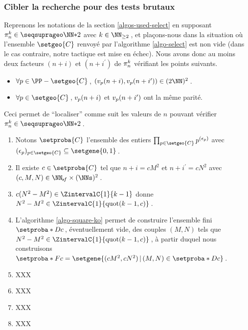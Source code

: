\subsubsection{Cibler la recherche pour des tests brutaux} \label{algos-used-kill}

\leavevmode
\smallskip

Reprenons les notations de la section \ref{algos-used-select} en supposant $\consprod \in \NNssquare$ avec $k \in \NN_{\geq 2}$\,, et plaçons-nous dans la situation où l'ensemble $\setgeo{C}$ renvoyé par l'algorithme \ref{algo-select} est non vide (dans le cas contraire, notre tactique est mise en échec).
Nous avons donc au moins deux facteurs $(n+i)$ et $(n+i^\prime)$ de $\consprod$ vérifiant les points suivants.
%
\begin{itemize}
	\item $\forall p \in \PP - \setgeo{C}$\,, $( \padicval{n+i}, \padicval{n+i^\prime} ) \in ( 2 \NN )^2$\,.

	\item $\forall p \in \setgeo{C}$\,, $\padicval{n+i}$ et $\padicval{n+i^\prime}$ ont la même parité.
\end{itemize}

Ceci permet de \enquote{localiser} comme suit les valeurs de $n$ pouvant vérifier $\consprod \in \NNssquare$\,.
%
\begin{enumerate}
	\item Notons $\setproba{C}$ l'ensemble des entiers $\prod_{p \in \setgeo{C}} p^{(\epsilon_p)}$ avec $(\epsilon_p)_{p \in \setgeo{C}} \subseteq \setgene{0, 1}$\,.


	\item Il existe $c \in \setproba{C}$ tel que $n+i = c M^2$ et $n+i^\prime = c N^2$ avec $(c, M, N) \in \NNsf \times ( \NNs )^2$\,.
	


	\item $c ( N^2 - M^2 ) \in \ZintervalC{1}{k-1}$ donne $N^2 - M^2 \in \ZintervalC{1}{\quot{k-1}{c}}$\,.


	\item L'algorithme \ref{algo-square-ko} permet de construire l'ensemble fini $\setproba*{D}{c}$\,, éventuellement vide, des couples $(M, N)$ tels que $N^2 - M^2 \in \ZintervalC{1}{\quot{k-1}{c}}$\,,
	à partir duquel nous construisons 
	$\setproba*{F}{c} = \setgene{(c M^2, c N^2) \, | \, (M, N) \in \setproba*{D}{c}}$\,.
	


	\item XXX


	\item XXX


	\item XXX


	\item XXX
\end{enumerate}







